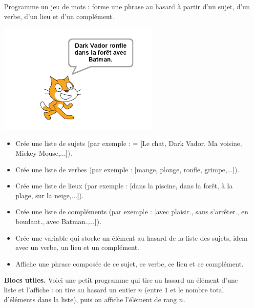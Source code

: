 \documentclass[class=report,crop=false, 12pt]{standalone}
\begin{document}
\begin{activite}

Programme un jeu de mots : forme une phrase au hasard à partir d'un sujet, d'un verbe, d'un lieu et d'un complément.

\begin{center}
  \includegraphics[width=0.6\textwidth]{ecran-12-ex2} 
\end{center}

\begin{itemize}
  \item Crée une liste de sujets (par exemple :  = [Le chat, Dark Vador, Ma voisine, Mickey Mouse,...]).
  \item Crée une liste de verbes (par exemple : [mange, plonge, ronfle, grimpe,...]).
  \item Crée une liste de lieux (par exemple : [dans la piscine, dans la forêt, à la plage, sur la neige,...]).  
  \item Crée une liste de compléments (par exemple : [avec plaisir., sans s'arrêter., en boudant., avec Batman.,...]). 
  \item Crée une variable  qui stocke un élément au hasard de la liste des sujets, idem avec un verbe, un lieu et un complément.
  \item Affiche une phrase composée de ce sujet, ce verbe, ce lieu et ce complément.
\end{itemize}



\bigskip

\textbf{Blocs utiles.}
Voici une petit programme qui tire au hasard un élément d'une liste et l'affiche : on tire au hasard un entier $n$ (entre $1$ et le nombre total d'éléments dans la liste), puis on affiche l'élément de rang $n$.

\begin{center}
\begin{scratch}
  {
  }
\end{scratch}
\end{center} 
  
\end{activite}
\end{document}
